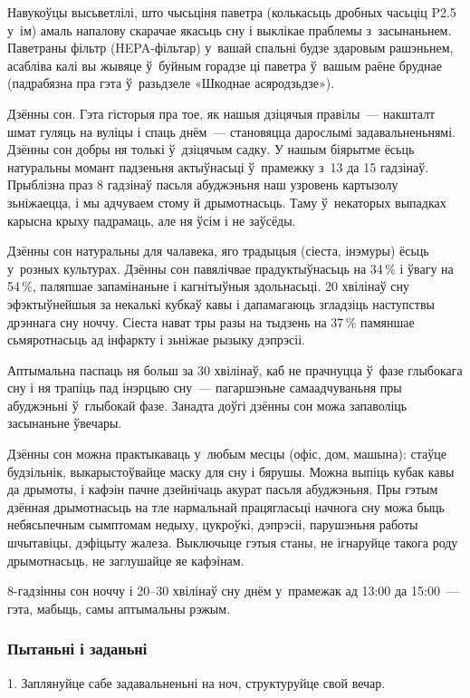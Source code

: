 Навукоўцы высьветлілі, што чысьціня паветра (колькасьць дробных часьціц P2.5 у~ім) амаль напалову скарачае якасьць сну і выклікае праблемы з~засынаньнем. Паветраны фільтр (HEPA-фільтар) у~вашай спальні будзе здаровым рашэньнем, асабліва калі вы жывяце ў~буйным горадзе ці паветра ў~вашым раёне бруднае (падрабязна пра гэта ў~разьдзеле «Шкоднае асяродзьдзе»).

Дзённы сон. Гэта гісторыя пра тое, як нашыя дзіцячыя правілы~--- накшталт шмат гуляць на вуліцы і спаць днём~--- становяцца дарослымі задавальненьнямі. Дзённы сон добры ня толькі ў~дзіцячым садку. У нашым біярытме ёсьць натуральны момант падзеньня актыўнасьці ў~прамежку з~13 да 15 гадзінаў. Прыблізна праз 8 гадзінаў пасьля абуджэньня наш узровень картызолу зьніжаецца, і мы адчуваем стому й дрымотнасьць. Таму ў~некаторых выпадках карысна крыху падрамаць, але ня ўсім і не заўсёды.

Дзённы сон натуральны для чалавека, яго традыцыя (сіеста, інэмуры) ёсьць у~розных культурах. Дзённы сон павялічвае прадуктыўнасьць на 34\,\% і ўвагу на 54\,\%, паляпшае запамінаньне і кагнітыўныя здольнасьці. 20 хвілінаў сну эфэктыўнейшыя за некалькі кубкаў кавы і дапамагаюць згладзіць наступствы дрэннага сну ноччу. Сіеста нават тры разы на тыдзень на 37\,\% памяншае сьмяротнасьць ад інфаркту і зьніжае рызыку дэпрэсіі.

Аптымальна паспаць ня больш за 30 хвілінаў, каб не прачнуцца ў~фазе глыбокага сну і ня трапіць пад інэрцыю сну~--- пагаршэньне самаадчуваньня пры абуджэньні ў~глыбокай фазе. Занадта доўгі дзённы сон можа запаволіць засынаньне ўвечары.

Дзённы сон можна практыкаваць у~любым месцы (офіс, дом, машына): стаўце будзільнік, выкарыстоўвайце маску для сну і бярушы. Можна выпіць кубак кавы да дрымоты, і кафэін пачне дзейнічаць акурат пасьля абуджэньня. Пры гэтым дзённая дрымотнасьць на тле нармальнай працягласьці начнога сну можа быць небясьпечным сымптомам недыху, цукроўкі, дэпрэсіі, парушэньня работы шчытавіцы, дэфіцыту жалеза. Выключыце гэтыя станы, не ігнаруйце такога роду дрымотнасьць, не заглушайце яе кафэінам.

8-гадзінны сон ноччу і 20--30 хвілінаў сну днём у~прамежак ад 13:00 да 15:00~--- гэта, мабыць, самы аптымальны рэжым.

\subsubsection{Пытаньні і заданьні}

1. Заплянуйце сабе задавальненьні на ноч, структуруйце свой вечар.

